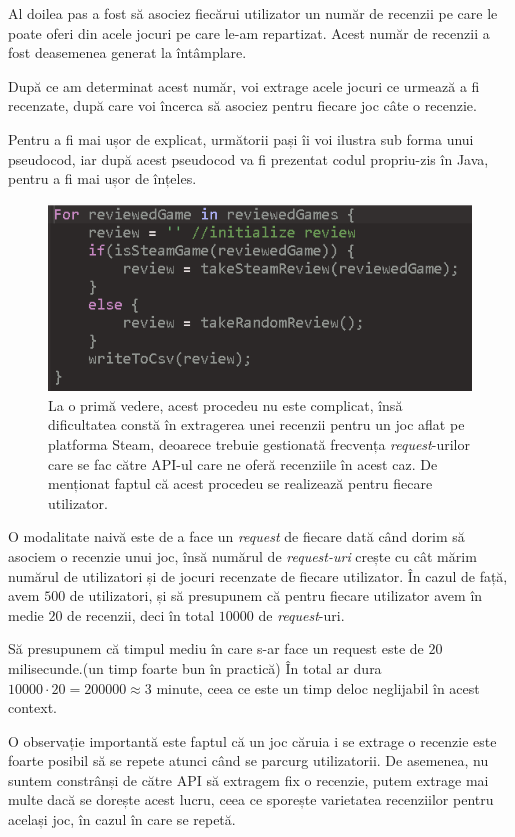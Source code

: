 \documentclass[12pt,a4paper]{report}
\begin{document}
Al doilea pas a fost să asociez fiecărui utilizator un număr de recenzii pe care le poate oferi din acele jocuri pe care le-am repartizat. Acest număr de recenzii a fost deasemenea generat la întâmplare.

După ce am determinat acest număr, voi extrage acele jocuri ce urmează a fi recenzate, după care voi încerca să asociez pentru fiecare joc câte o recenzie. 

Pentru a fi mai ușor de explicat, următorii pași îi voi ilustra sub forma unui pseudocod, iar după acest pseudocod va fi prezentat codul propriu-zis în Java, pentru a fi mai ușor de înțeles.

\begin{figure}[H]
\centering
\caption{}
\includegraphics[scale = 0.8]{exemplu_13_review_code}
\caption*{La o primă vedere, acest procedeu nu este complicat, însă dificultatea constă în extragerea unei recenzii pentru un joc aflat pe platforma Steam, deoarece trebuie gestionată frecvența \emph{request}-urilor care se fac către API-ul care ne oferă recenziile în acest caz. De menționat faptul că acest procedeu se realizează pentru fiecare utilizator.}
\end{figure}

O modalitate naivă este de a face un \emph{request} de fiecare dată când dorim să asociem o recenzie unui joc, însă numărul de \emph{request-uri} crește cu cât mărim numărul de utilizatori și de jocuri recenzate de fiecare utilizator. În cazul de față, avem \(500\) de utilizatori, și să presupunem că pentru fiecare utilizator avem în medie \(20\) de recenzii, deci în total \(10 000 \) de \emph{request}-uri.

Să presupunem că timpul mediu în care s-ar face un request este de \( 20 \) milisecunde.(un timp foarte bun în practică) În total ar dura \( 10 000 \cdot 20 = 200000 \approx 3 \) minute, ceea ce este un timp deloc neglijabil în acest context.

O observație importantă este faptul că un joc căruia i se extrage o recenzie este foarte posibil să se repete atunci când se parcurg utilizatorii. De asemenea, nu suntem constrânși de către API să extragem fix o recenzie, putem extrage mai multe dacă se dorește acest lucru, ceea ce sporește varietatea recenziilor pentru același joc, în cazul în care se repetă.
\end{document}
